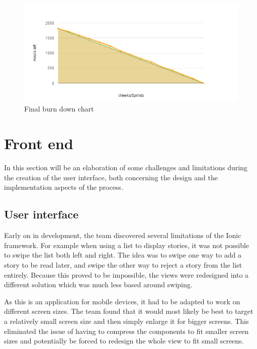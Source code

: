 \begin{figure}[h!]
	\centering
	\includegraphics[width=\textwidth]{fig/burnDownAfter}
	\caption{Final burn down chart}
	\label{Fig:burnDownAfter}
\end{figure}

\section{Front end}

In this section will be an elaboration of some challenges and limitations during the creation of the user interface, both concerning the design and the implementation aspects of the process.

\subsection{User interface}
\label{subsec:user_interface}

Early on in development, the team discovered several limitations of the Ionic framework. For example when using a list to display stories, it was not possible to swipe the list both left and right. The idea was to swipe one way to add a story to be read later, and swipe the other way to reject a story from the list entirely.  Because this proved to be impossible, the views were redesigned into a different solution which was much less based around swiping.\newline

As this is an application for mobile devices, it had to be adapted to work on different screen sizes. The team found that it would most likely be best to target a relatively small screen size and then simply enlarge it for bigger screens. This eliminated the issue of having to compress the components to fit smaller screen sizes and potentially be forced to redesign the whole view to fit small screens.\newline

